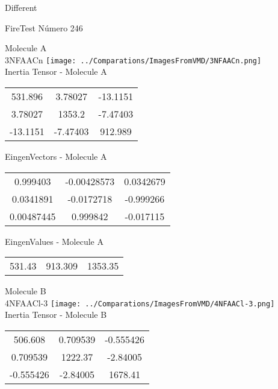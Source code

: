 \begin{center}
\vtab
\vtab
\textcolor{NavyBlue}{\Large Different}
\end{center}

 \newpage

\vtab[-2cm]
\begin{center}
{\large FireTest \tab Número 246}
\end{center}
\begin{multicols}{2}
\begin{center}

Molecule A \\ 
3NFAACn
\texttt{[image: ../Comparations/ImagesFromVMD/3NFAACn.png]}
\\
Inertia Tensor - Molecule A \\
\vtab

\begin{tabular}{|c c c|}
531.896	 & 	3.78027	 & 	-13.1151	 \\
3.78027	 & 	1353.2	 & 	-7.47403	 \\
-13.1151	 & 	-7.47403	 & 	912.989
\end{tabular}

\vtab
 EingenVectors - Molecule A     \\
\vtab
\begin{tabular}{|c c c|}
0.999403	 & 	-0.00428573	 & 	0.0342679	 \\
0.0341891	 & 	-0.0172718	 & 	-0.999266	 \\
0.00487445	 & 	0.999842	 & 	-0.017115
\end{tabular}

\vtab
 EingenValues - Molecule A     \\
\vtab
\begin{tabular}{|c c c|}
531.43	 & 	913.309	 & 	1353.35	 \\
\end{tabular}
\columnbreak

Molecule B \\ 
4NFAACl-3
\texttt{[image: ../Comparations/ImagesFromVMD/4NFAACl-3.png]}
\\
Inertia Tensor - Molecule B \\
\vtab

\begin{tabular}{|c c c|}
506.608	 & 	0.709539	 & 	-0.555426	 \\
0.709539	 & 	1222.37	 & 	-2.84005	 \\
-0.555426	 & 	-2.84005	 & 	1678.41
\end{tabular}


\end{center}
\end{multicols}

